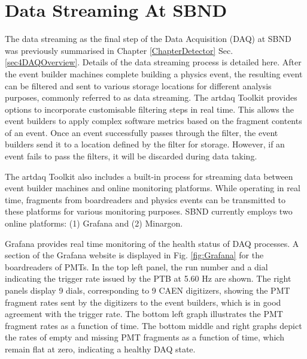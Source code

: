 \chapter{Data Streaming At SBND} 
\label{appendix_data_stream}
\ifpdf
    \graphicspath{{Appendix2/Figs/Raster/}{Appendix2/Figs/PDF/}{Appendix2/Figs/}}
\else
    \graphicspath{{Appendix2/Figs/Vector/}{Appendix2/Figs/}}
\fi

The data streaming as the final step of the Data Acquisition (DAQ) at SBND was previously summarised in Chapter \ref{ChapterDetector} Sec.  \ref{sec4DAQOverview}.
Details of the data streaming process is detailed here.
After the event builder machines complete building a physics event, the resulting event can be filtered and sent to various storage locations for different analysis purposes, commonly referred to as data streaming.
The artdaq Toolkit provides options to incorporate customisable filtering steps in real time. 
This allows the event builders to apply complex software metrics based on the fragment contents of an event. 
Once an event successfully passes through the filter, the event builders send it to a location defined by the filter for storage. 
However, if an event fails to pass the filters, it will be discarded during data taking.

The artdaq Toolkit also includes a built-in process for streaming data between event builder machines and online monitoring platforms.
While operating in real time, fragments from boardreaders and physics events can be transmitted to these platforms for various monitoring purposes. 
SBND currently employs two online platforms: (1) Grafana and (2) Minargon.

Grafana provides real time monitoring of the health status of DAQ processes. 
A section of the Grafana website is displayed in Fig. \ref{fig:Grafana} for the boardreaders of PMTs.
In the top left panel, the run number and a dial indicating the trigger rate issued by the PTB at 5.60 Hz are shown. 
The right panels display 9 dials, corresponding to 9 CAEN digitizers, showing the PMT fragment rates sent by the digitizers to the event builders, which is in good agreement with the trigger rate.
The bottom left graph illustrates the PMT fragment rates as a function of time. 
The bottom middle and right graphs depict the rates of empty and missing PMT fragments as a function of time, which remain flat at zero, indicating a healthy DAQ state.

